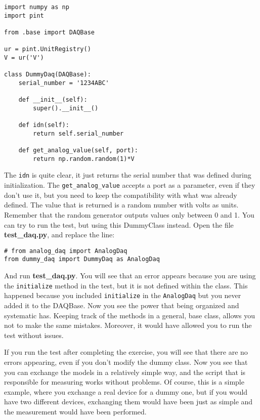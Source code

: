 {\begin{verbatim}
import numpy as np
import pint

from .base import DAQBase

ur = pint.UnitRegistry()
V = ur('V')

class DummyDaq(DAQBase):
    serial_number = '1234ABC'
    
    def __init__(self):
        super().__init__()
    
    def idn(self):
        return self.serial_number
    
    def get_analog_value(self, port):
        return np.random.random(1)*V
\end{verbatim}

The \texttt{idn} is quite clear, it just returns the serial number that
was defined during initialization. The \texttt{get_analog_value}
accepts a port as a parameter, even if they don't use it, but you need
to keep the compatibility with what was already defined. The value that
is returned is a random number with volts as units. Remember that the
random generator outputs values only between 0 and 1. You can try to run
the test, but using this DummyClass instead. Open the file
\textbf{test\_daq.py}, and replace the line:

\begin{verbatim}
# from analog_daq import AnalogDaq
from dummy_daq import DummyDaq as AnalogDaq
\end{verbatim}

And run \textbf{test\_daq.py}. You will see that an error appears
because you are using the \texttt{initialize} method in the test, but it
is not defined within the class. This happened because you included
\texttt{initialize} in the
\texttt{AnalogDaq} but you never added it to the DAQBase.
Now you see the power that being organized and systematic has. Keeping
track of the methods in a general, base class, allows you not to make
the same mistakes. Moreover, it would have allowed you to run the test
without issues.


If you run the test after completing the exercise, you will see that
there are no errors appearing, even if you don't modify the dummy class.
Now you see that you can exchange the models in a relatively simple way,
and the script that is responsible for measuring works without problems.
Of course, this is a simple example, where you exchange a real device
for a dummy one, but if you would have two different devices, exchanging
them would have been just as simple and the measurement would have
been performed.

}
